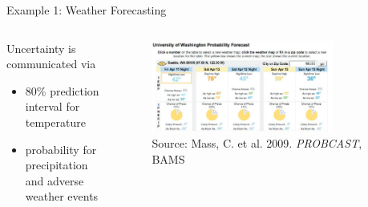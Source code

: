 \documentclass[en]{sdqbeamer}
\begin{document}
\addtocounter{framenumber}{-1}
\begin{frame}[t]{Example 1: Weather Forecasting}
\begin{columns}
\begin{column}{0.35\textwidth}
Uncertainty is communicated via \smallskip
    \begin{itemize}
         \item $80\%$ prediction interval for temperature \medskip
         \item probability for precipitation and adverse weather events
    \end{itemize}
    \vspace{2cm}
\end{column}
\begin{column}{0.65\textwidth}
\vspace*{-.05cm}
    \begin{figure}
        \centering
        \includegraphics[width=0.8\textwidth]{figures_svr/Probcast.jpg} 
        \caption{Source: Mass, C. et al. 2009. \textit{PROBCAST}, BAMS}
    \end{figure}
\end{column}
\end{columns}
\end{frame}
\end{document}
